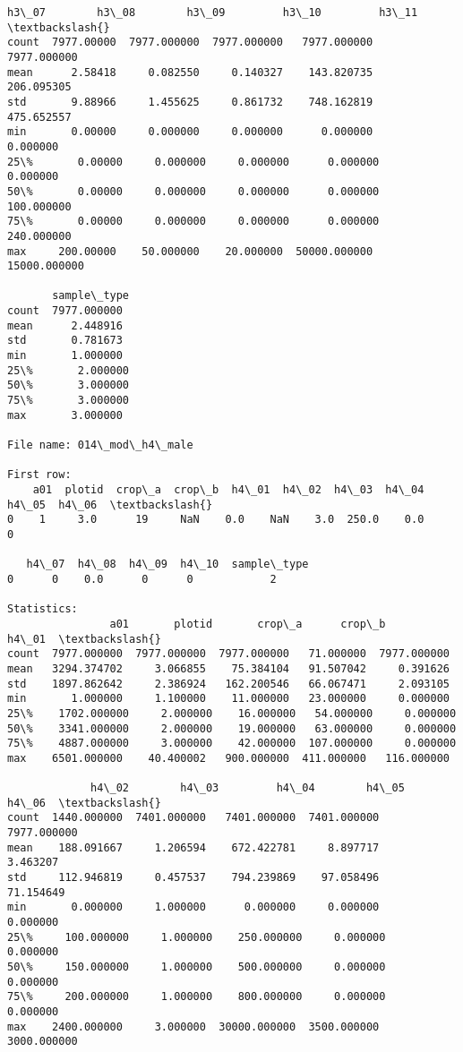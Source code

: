 \documentclass[11pt]{article}
\begin{document}
\begin{Verbatim}[commandchars=\\\{\}]
            h3\_07        h3\_08        h3\_09         h3\_10         h3\_11  \textbackslash{}
count  7977.00000  7977.000000  7977.000000   7977.000000   7977.000000   
mean      2.58418     0.082550     0.140327    143.820735    206.095305   
std       9.88966     1.455625     0.861732    748.162819    475.652557   
min       0.00000     0.000000     0.000000      0.000000      0.000000   
25\%       0.00000     0.000000     0.000000      0.000000      0.000000   
50\%       0.00000     0.000000     0.000000      0.000000    100.000000   
75\%       0.00000     0.000000     0.000000      0.000000    240.000000   
max     200.00000    50.000000    20.000000  50000.000000  15000.000000   

       sample\_type  
count  7977.000000  
mean      2.448916  
std       0.781673  
min       1.000000  
25\%       2.000000  
50\%       3.000000  
75\%       3.000000  
max       3.000000  

File name: 014\_mod\_h4\_male

First row: 
    a01  plotid  crop\_a  crop\_b  h4\_01  h4\_02  h4\_03  h4\_04  h4\_05  h4\_06  \textbackslash{}
0    1     3.0      19     NaN    0.0    NaN    3.0  250.0    0.0      0   

   h4\_07  h4\_08  h4\_09  h4\_10  sample\_type  
0      0    0.0      0      0            2  

Statistics: 
                a01       plotid       crop\_a      crop\_b        h4\_01  \textbackslash{}
count  7977.000000  7977.000000  7977.000000   71.000000  7977.000000   
mean   3294.374702     3.066855    75.384104   91.507042     0.391626   
std    1897.862642     2.386924   162.200546   66.067471     2.093105   
min       1.000000     1.100000    11.000000   23.000000     0.000000   
25\%    1702.000000     2.000000    16.000000   54.000000     0.000000   
50\%    3341.000000     2.000000    19.000000   63.000000     0.000000   
75\%    4887.000000     3.000000    42.000000  107.000000     0.000000   
max    6501.000000    40.400002   900.000000  411.000000   116.000000   

             h4\_02        h4\_03         h4\_04        h4\_05        h4\_06  \textbackslash{}
count  1440.000000  7401.000000   7401.000000  7401.000000  7977.000000   
mean    188.091667     1.206594    672.422781     8.897717     3.463207   
std     112.946819     0.457537    794.239869    97.058496    71.154649   
min       0.000000     1.000000      0.000000     0.000000     0.000000   
25\%     100.000000     1.000000    250.000000     0.000000     0.000000   
50\%     150.000000     1.000000    500.000000     0.000000     0.000000   
75\%     200.000000     1.000000    800.000000     0.000000     0.000000   
max    2400.000000     3.000000  30000.000000  3500.000000  3000.000000   


\end{Verbatim}
\end{document}
